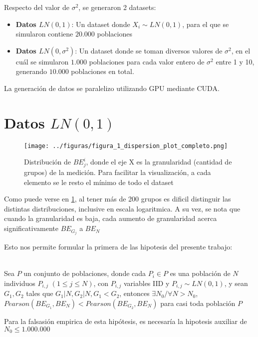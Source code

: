 Respecto del valor de $\sigma^2$, se generaron 2 datasets:

\begin{itemize}
    \item \textbf{Datos $LN(0,1)$}: Un dataset donde $X_i \sim LN(0,1)$, para el que se simularon contiene $20.000$ poblaciones
    \item \textbf{Datos $LN(0,\sigma^2)$}: Un dataset donde se toman diversos valores de $\sigma^2$, en el cuál se simularon $1.000$ poblaciones para cada valor entero de $\sigma^2$ entre 1 y 10, generando $10.000$ poblaciones en total.
\end{itemize}

La generación de datos se paralelizo utilizando GPU mediante CUDA\cite{lasorsa2024simluacion_cuda}.

\section{Datos $LN(0,1)$}

\begin{figure}[H] %
    \centering %
    \texttt{[image: ../figuras/figura\_1\_dispersion\_plot\_completo.png]} %
    \caption{Distribución de $BE_j^i$, donde el eje X es la granularidad (cantidad de grupos) de la medición. Para facilitar la visualización, a cada elemento se le resto el mínimo de todo el dataset}
    \label{fig:1} %
\end{figure}

Como puede verse en \ref{fig:1}, al tener más de 200 grupos es dificil distinguir las distintas distribuciones, inclusive en escala logaritmica. A su vez, se nota que cuando la granularidad es baja, cada aumento de granularidad acerca significativamente $BE_{G_j}$ a $BE_N$

Esto nos permite formular la primera de las hipotesis del presente trabajo:

\begin{hipotesis}\label{hipo:1}
    \\
    Sea $P$ un conjunto de poblaciones, donde cada $P_i \in P$ es una población de $N$ individuos $P_{i,j}$ $(1 \leq j \leq N)$, con $P_{i,j}$ variables IID y $P_{i,j} \sim LN(0,1)$, y sean $G_1, G_2$ tales que $G_1|N, G_2|N, G_1 < G_2$, entonces $\exists N_0 / \forall N > N_0 $, $Pearson(BE_{G_1},BE_N) < Pearson(BE_{G_2},BE_N)$ para casi toda población $P$
    
    Para la falsasión empirica de esta hipótesis, es necesaría la hipotesis auxiliar de $N_0 \leq 1.000.000$    
%
\end{hipotesis}

